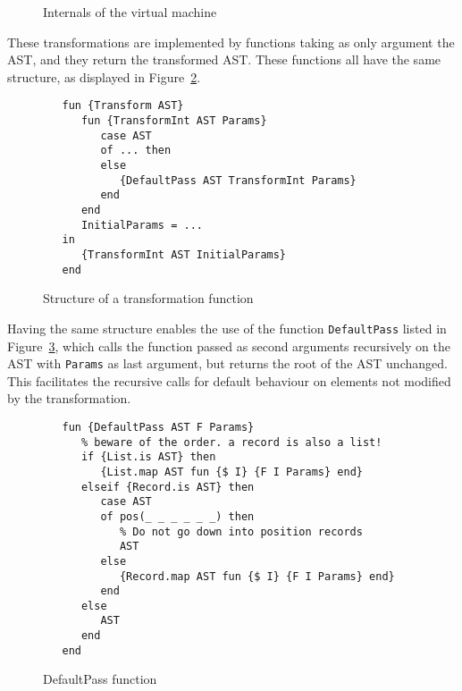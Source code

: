 \documentclass[a4paper]{memoir}
\begin{document}
\begin{figure}[h]
\caption{Internals of the virtual machine}
\label{fig:compiler_passes}
\end{figure}


These transformations are implemented by functions
taking as only argument the AST, and they return the transformed AST.
These functions all have the same structure, as displayed in Figure~\ref{fig:pass_structure}.
\begin{figure}[h]
\begin{lstlisting}
   fun {Transform AST}
      fun {TransformInt AST Params}
         case AST
         of ... then
         else
            {DefaultPass AST TransformInt Params}
         end
      end
      InitialParams = ...
   in
      {TransformInt AST InitialParams}
   end
\end{lstlisting}
\caption{Structure of a transformation function}
\label{fig:pass_structure}
\end{figure}
Having the same structure enables the use of the function
\lstinline!DefaultPass! listed in Figure~\ref{fig:default_pass}, which calls the
function passed as second arguments recursively on the AST with
\lstinline!Params! as last argument, but returns the root of the AST unchanged. This
facilitates the recursive calls for default behaviour on elements not modified
by the transformation.


\begin{figure}[h]
\begin{lstlisting}
   fun {DefaultPass AST F Params}
      % beware of the order. a record is also a list!
      if {List.is AST} then
         {List.map AST fun {$ I} {F I Params} end}
      elseif {Record.is AST} then
         case AST
         of pos(_ _ _ _ _ _) then
            % Do not go down into position records
            AST
         else
            {Record.map AST fun {$ I} {F I Params} end}
         end
      else
         AST
      end
   end
\end{lstlisting}
\caption{DefaultPass function}
\label{fig:default_pass}
\end{figure}
\end{document}
